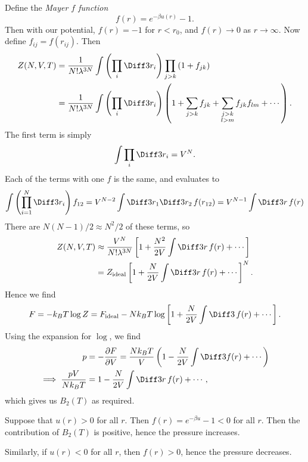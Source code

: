\documentclass[12pt]{article}
\begin{document}
Define the \emph{Mayer $f$ function}
\[
f(r) = e^{-\beta u(r)} - 1.
\]
Then with our potential, $f(r) = -1$ for $r < r_0$, and $f(r) \to 0$ as $r \to \infty$. Now define $f_{ij} = f(r_{ij})$. Then
\begin{align*}
	Z(N, V, T) &= \frac{1}{N! \lambda^{3N}} \int \left( \prod_{i} \Diff3 r_i \right) \prod_{j > k} \left( 1 + f_{jk} \right) \\
		   &= \frac{1}{N! \lambda^{3N}} \int \left( \prod_i \Diff3 r_i \right) \left( 1 + \sum_{j > k} f_{jk} + \sum_{\substack{j > k \\ l > m}} f_{jk} f_{lm} + \cdots \right).
\end{align*}
The first term is simply
\[
\int \prod_i \Diff3 r_i = V^N.
\]
Each of the terms with one $f$ is the same, and evaluates to
\[
\int \left( \prod_{i = 1}^{N} \Diff3 r_i \right) f_{12} = V^{N - 2} \int \Diff3 r_1 \Diff3 r_2 \, f(r_{12}) = V^{N-1} \int \Diff3 r \, f(r)
\]
There are $N(N-1)/2 \approx N^2/2$ of these terms, so
\begin{align*}
	Z(N, V, T) &\approx \frac{V^N}{N! \lambda^{3N}} \left[1 + \frac{N^2}{2V} \int \Diff3 r \, f(r) + \cdots \right] \\
		   &= Z_{\mathrm{ideal}}\left[1 + \frac{N}{2V} \int \Diff3 r \, f(r) + \cdots \right]^{N}.
\end{align*}
Hence we find
\[
	F = -k_B T \log Z = F_{\mathrm{ideal}} - N k_B T \log \left[1 + \frac{N}{2V} \int \Diff3 \, f(r) + \cdots \right].
\]
Using the expansion for $\log$, we find
\begin{align*}
	p &= - \frac{\partial F}{\partial V} = \frac{N k_B T}{V} \left(1 - \frac{N}{2V} \int \Diff3 f(r) + \cdots \right) \\
	\implies \frac{pV}{N k_B T} &= 1 - \frac{N}{2V} \int \Diff3 r \, f(r) + \cdots,
\end{align*}
which gives us $B_2(T)$ as required.

\begin{exbox}
	Suppose that $u(r) > 0$ for all $r$. Then $f(r) = e^{-\beta u} - 1 < 0$ for all $r$. Then the contribution of $B_2(T)$ is positive, hence the pressure increases.

	Similarly, if $u(r) < 0$ for all $r$, then $f(r) > 0$, hence the pressure decreases.
\end{exbox}

\end{document}
